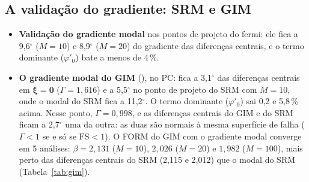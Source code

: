 \documentclass[11pt,a4paper]{article}
\begin{document}
\subsection{A validação do gradiente: SRM e GIM}\label{sec:validacao}
\begin{itemize}
  \item \textbf{Validação do gradiente modal} nos pontos de projeto do fermi: ele fica a 9,6$^\circ$ ($M = 10$) e
    8,9$^\circ$ ($M = 20$) do gradiente das diferenças centrais, e o termo dominante ($\varphi'_0$) bate a menos de 4\,\%.
  \item \textbf{O gradiente modal do GIM} (), no PC: fica a 3{,}1$^\circ$ das diferenças centrais em $\bm\xi = \bm 0$ ($\Gamma = 1{,}616$) e a 5{,}5$^\circ$ no ponto de projeto
    do SRM com $M = 10$, onde o modal do SRM fica a 11{,}2$^\circ$. O termo
    dominante ($\varphi'_0$) sai 0{,}2 e 5{,}8\,\% acima. Nesse ponto, $\Gamma = 0{,}998$, e as diferenças centrais do GIM e do SRM ficam a 2{,}7$^\circ$ uma da outra: as duas são normais à mesma superfície de falha ($\Gamma < 1$ se e só se
    $\mathrm{FS} < 1$). O FORM do GIM com o gradiente modal converge em 5 análises: $\beta = 2{,}131$ ($M = 10$), $2{,}026$ ($M = 20$) e $1{,}982$ ($M = 100$), mais perto das diferenças centrais
    do SRM (2,115 e 2,012) que o modal do SRM (Tabela~\ref{tab:gim}).
\end{itemize}
\begin{table}[H]\centering\small
{}
\caption{$\beta$ do FORM (corrigido: a distância da origem ao plano tangente no último ponto) com cada gradiente, na malha
usual. GIM: $g = \Gamma - 1$; SRM: $g = \mathrm{FS} - 1$. A região de falha é a mesma nos dois, então o $\beta$ também
deveria ser.}\label{tab:gim}
\end{table}
\end{document}
